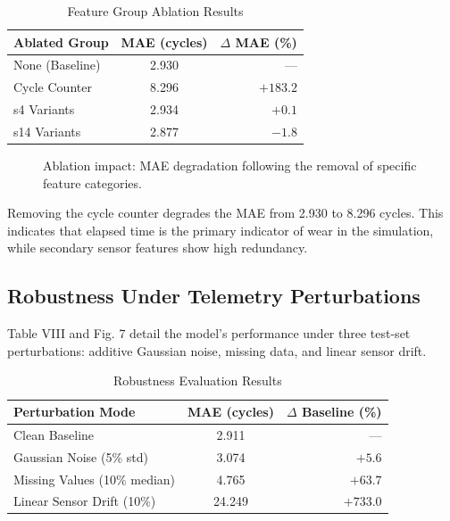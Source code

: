 \documentclass[letterpaper, 10 pt, conference]{ieeeconf}
\begin{document}
\begin{table}[htbp]
\caption{Feature Group Ablation Results}
\label{tab:ablation}
\centering\small
\begin{tabular}{lcr}
\toprule
\textbf{Ablated Group} & \textbf{MAE (cycles)} & \textbf{$\Delta$ MAE (\%)} \\
\midrule
None (Baseline) & 2.930 & --- \\
Cycle Counter & 8.296 & $+183.2$ \\
s4 Variants & 2.934 & $+0.1$ \\
s14 Variants & 2.877 & $-1.8$ \\
\bottomrule
\end{tabular}
\end{table}

\begin{figure}[htbp]
\centering
{}
\caption{Ablation impact: MAE degradation following the removal of specific feature categories.}
\label{fig:ablation_bar}
\end{figure}

Removing the cycle counter degrades the MAE from 2.930 to 8.296 cycles. This indicates that elapsed time is the primary indicator of wear in the simulation, while secondary sensor features show high redundancy.

\subsection{Robustness Under Telemetry Perturbations}
\label{subsec:robust_pert}
Table VIII and Fig. 7 detail the model's performance under three test-set perturbations: additive Gaussian noise, missing data, and linear sensor drift.

\begin{table}[htbp]
\caption{Robustness Evaluation Results}
\label{tab:robust}
\centering\small
\begin{tabular}{lcr}
\toprule
\textbf{Perturbation Mode} & \textbf{MAE (cycles)} & \textbf{$\Delta$ Baseline (\%)} \\
\midrule
Clean Baseline & 2.911 & --- \\
Gaussian Noise (5\% std) & 3.074 & $+5.6$ \\
Missing Values (10\% median) & 4.765 & $+63.7$ \\
Linear Sensor Drift (10\%) & 24.249 & $+733.0$ \\
\bottomrule
\end{tabular}
\end{table}
\end{document}
